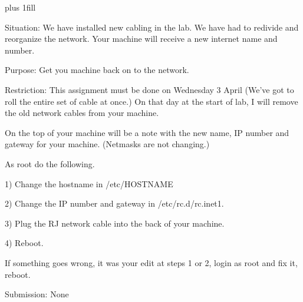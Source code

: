 
\rightskip=0pt plus 1fill

\parindent 0pt

Situation:
We have installed new cabling in the lab.
We have had to redivide and reorganize the network.
Your machine will receive a new internet name and number.

Purpose:
Get you machine back on to the network.

Restriction:
This assignment must be done on Wednesday 3 April
(We've got to roll the entire set of cable at once.)
On that day at the start of lab, I will remove the
old network cables from your machine.

On the top of your machine will be a note
with the new name, IP number and
gateway for your machine.
(Netmasks are not changing.)

As root do the following.

1) Change the hostname in {\ltt{}/etc/HOSTNAME}

2) Change the IP number and gateway in {\ltt{}/etc/rc.d/rc.inet1}.

3) Plug the RJ network cable into the back of your machine.

4) Reboot.

If something goes wrong, it was your edit at  steps 1 or 2,
login as root and fix it, reboot.

Submission: None

\bye
